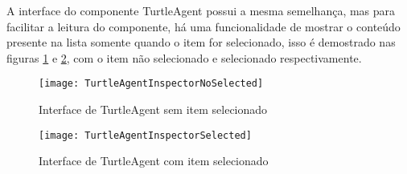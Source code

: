 A interface do componente TurtleAgent possui a mesma semelhança, mas para facilitar a leitura do componente, há uma funcionalidade de mostrar o conteúdo presente na lista somente quando o item for selecionado, isso é demostrado nas figuras \ref{TurtleAgentWithout} e \ref{TurtleAgentSelect}, com o item não selecionado e selecionado respectivamente.

\begin{figure}[!h]
	\centering
	\texttt{[image: TurtleAgentInspectorNoSelected]}
	\caption{Interface de TurtleAgent sem item selecionado}
	\label{TurtleAgentWithout}
\end{figure}

\begin{figure}[!h]
	\centering
	\texttt{[image: TurtleAgentInspectorSelected]}
	\caption{Interface de TurtleAgent com item selecionado}
	\label{TurtleAgentSelect}
\end{figure}